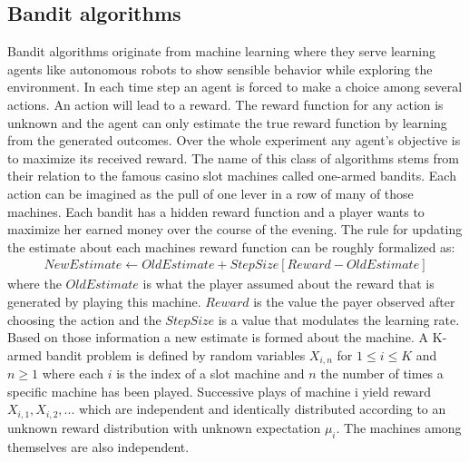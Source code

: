\documentclass[main.tex]{subfiles}
\begin{document}
\subsection{Bandit algorithms}
Bandit algorithms originate from machine learning where they serve learning agents like autonomous robots to show sensible behavior while exploring the environment. In each time step an agent is forced to make a choice among several actions. An action will lead to a reward. The reward function for any action is unknown and the agent can only estimate the true reward function by learning from the generated outcomes. Over the whole experiment any agent's objective is to maximize its received reward. The name of this class of algorithms stems from their relation to the famous casino slot machines called one-armed bandits. Each action can be imagined as the pull of one lever in a row of many of those machines. Each bandit has a hidden reward function and a player wants to maximize her earned money over the course of the evening. The rule for updating the estimate about each machines reward function can be roughly formalized as:
\begin{align*}
NewEstimate \leftarrow OldEstimate + StepSize[Reward - OldEstimate]
\end{align*}
where the $OldEstimate$ is what the player assumed about the reward that is generated by playing this machine. $Reward$ is the value the payer observed after choosing the action and the $StepSize$ is a value that modulates the learning rate. Based on those information a new estimate is formed about the machine. A K-armed bandit problem is defined by random variables $X_{i,n}$ for $1 \leq i \leq K$ and $n\geq1$ where each $i$ is the index of a slot machine and $n$ the number of times a specific machine has been played. Successive plays of machine i yield reward $X_{i,1},X_{i,2},...$ which are independent and identically distributed according to an unknown reward distribution with unknown expectation $\mu_i$. The machines among themselves are also independent.
\end{document}
